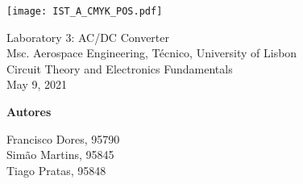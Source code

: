 \thispagestyle {empty}

\begin{titlepage}
\texttt{[image: IST\_A\_CMYK\_POS.pdf]}

\begin{center}
%
\vspace{1.0cm}

\vspace{5cm}
{\FontLb Laboratory 3: AC/DC Converter} \\
\vspace{1cm}
{\FontSn Msc. Aerospace Engineering, Técnico, University of Lisbon} \\
\vspace{1cm}
{\FontSn Circuit Theory and Electronics Fundamentals} \\
\vspace{1cm}
{\FontSn May 9, 2021} \\


\vspace{8cm}


\textbf{{Autores}\\[0.06in]}

Francisco Dores, 95790\\
Simão Martins, 95845\\
Tiago Pratas, 95848\\ 
\vspace{2cm}

\end{center}

\end{titlepage}

